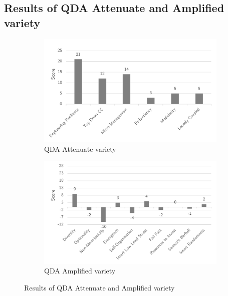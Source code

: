 \subsection{Results of QDA Attenuate and Amplified variety}
\label{sub:resultsqdavariety}
\begin{figure}[H]
	\centering
	\begin{subfigure}[H]{0.475\textwidth}
		\centering
		\includegraphics[width=\textwidth]{images/qdaattenuate}
		\caption{QDA Attenuate variety}
		\label{fig:qdaattenuate}
	\end{subfigure}%
\hfill
	\begin{subfigure}[H]{0.475\textwidth}
		\centering
		\includegraphics[width=\textwidth]{images/qdaamplify}
		\caption{QDA Amplified variety}
		\label{fig:qdaamplified}
	\end{subfigure}
	\caption{Results of QDA Attenuate and Amplified variety}
	\label{fig:resultsofqdavariety}
\end{figure}

